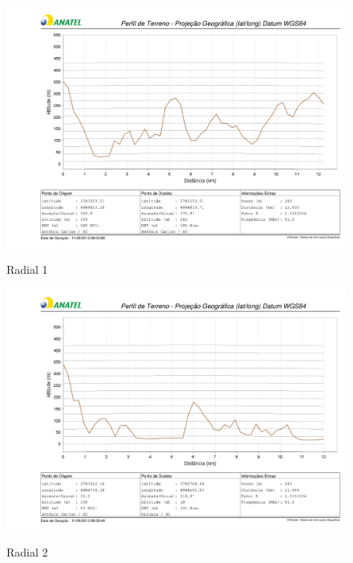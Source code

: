 \begin{figure}[ht] %
\begin{center}
\includegraphics[scale=.5]{./figuras/nmt1_v2.pdf} %

Radial 1

\end{center}
\label{nmt1}
\end{figure}

\begin{figure}[ht] %
\begin{center}
\includegraphics[scale=.5]{./figuras/nmt2_v2.pdf} %

Radial 2
\end{center}
\label{nmt2}
\end{figure}

